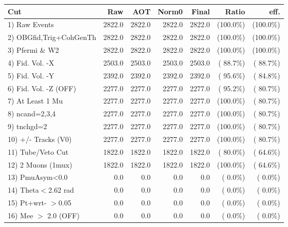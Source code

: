  \begin{table}[h!]\centering
 \begin{tabular}{||l||r|r|r|r|r|r||}
 \hline
 \hline
 Cut & Raw & AOT & Norm0 & Final & Ratio & eff.       \\
 \hline
  1) Raw Events           &       2822.0 &       2822.0 &       2822.0 &       2822.0 & (100.0\%) & (100.0\%) \\
  2) OBGfid,Trig+CohGenTh &       2822.0 &       2822.0 &       2822.0 &       2822.0 & (100.0\%) & (100.0\%) \\
  3) Pfermi \& W2         &       2822.0 &       2822.0 &       2822.0 &       2822.0 & (100.0\%) & (100.0\%) \\
  4) Fid. Vol. -X         &       2503.0 &       2503.0 &       2503.0 &       2503.0 & ( 88.7\%) & ( 88.7\%) \\
  5) Fid. Vol. -Y         &       2392.0 &       2392.0 &       2392.0 &       2392.0 & ( 95.6\%) & ( 84.8\%) \\
  6) Fid. Vol. -Z (OFF)   &       2277.0 &       2277.0 &       2277.0 &       2277.0 & ( 95.2\%) & ( 80.7\%) \\
  7) At Least 1 Mu        &       2277.0 &       2277.0 &       2277.0 &       2277.0 & (100.0\%) & ( 80.7\%) \\
  8) ncand=2,3,4          &       2277.0 &       2277.0 &       2277.0 &       2277.0 & (100.0\%) & ( 80.7\%) \\
  9) tnchgd=2             &       2277.0 &       2277.0 &       2277.0 &       2277.0 & (100.0\%) & ( 80.7\%) \\
 10) +/- Tracks (V0)      &       2277.0 &       2277.0 &       2277.0 &       2277.0 & (100.0\%) & ( 80.7\%) \\
 11) Tube/Veto Cut        &       1822.0 &       1822.0 &       1822.0 &       1822.0 & ( 80.0\%) & ( 64.6\%) \\
 12) 2 Muons (1mux)       &       1822.0 &       1822.0 &       1822.0 &       1822.0 & (100.0\%) & ( 64.6\%) \\
 13) PmuAsym<0.0          &          0.0 &          0.0 &          0.0 &          0.0 & (  0.0\%) & (  0.0\%) \\
 14) Theta$<$2.62 rad     &          0.0 &          0.0 &          0.0 &          0.0 & (  0.0\%) & (  0.0\%) \\
 15) Pt+wrt- $>$0.05      &          0.0 &          0.0 &          0.0 &          0.0 & (  0.0\%) & (  0.0\%) \\
 16) Mee $>$ 2.0  (OFF)   &          0.0 &          0.0 &          0.0 &          0.0 & (  0.0\%) & (  0.0\%) \\

\end{tabular}
\end{table}
